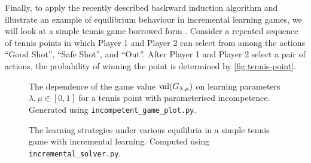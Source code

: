     Finally, to apply the recently described backward induction algorithm and illustrate an example of equilibrium behaviour in incremental learning games, we will look at a simple tennis game borrowed form \parencite[Section 4.2]{Beck2013}.
    Consider a repeated sequence of tennis points in which Player 1 and Player 2 can select from among the actions ``Good Shot'', ``Safe Shot'', and ``Out''.
    After Player 1 and Player 2 select a pair of actions, the probability of winning the point is determined by \autoref{fig:tennis-point}.

    \begin{figure}[t]
        \centering
        
        \caption[Game Value of a Simple Tennis Game]{The dependence of the game value $\operatorname{val}(G_{\lambda, \mu})$ on learning parameters $\lambda, \mu \in [0, 1]$ for a tennis point with parameterised incompetence. Generated using \texttt{incompetent\_game\_plot.py}.}
        \label{fig:tennis-game-plot}
    \end{figure}

    \begin{figure}[t]
        \centering
        \begin{minipage}{\textwidth}
            \subbottom[\label{fig:tennis-equilibrium-a}]%
                {}
            \hfill
            \subbottom[\label{fig:tennis-equilibrium-b}]%
                {}

            \subbottom[\label{fig:tennis-equilibrium-c}]%
                {}
            \hfill
            \caption[Equilibria in a Tennis Game with Learning]{The learning strategies under various equilibria in a simple tennis game with incremental learning. Computed using \texttt{incremental\_solver.py}.}
            \label{fig:tennis-equilibria}
        \end{minipage}
    \end{figure}


